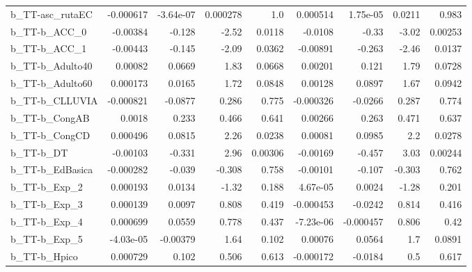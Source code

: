 \begin{tabular}{lrrrrrrrr}
b\_TT-asc\_rutaEC            &   -0.000617 &    -3.64e-07 &  0.000278 &      1.0 &   0.000514 &    1.75e-05 &       0.0211 &         0.983 \\
b\_TT-b\_ACC\_0               &    -0.00384 &       -0.128 &     -2.52 &   0.0118 &    -0.0108 &       -0.33 &        -3.02 &       0.00253 \\
b\_TT-b\_ACC\_1               &    -0.00443 &       -0.145 &     -2.09 &   0.0362 &   -0.00891 &      -0.263 &        -2.46 &        0.0137 \\
b\_TT-b\_Adulto40            &     0.00082 &       0.0669 &      1.83 &   0.0668 &    0.00201 &       0.121 &         1.79 &        0.0728 \\
b\_TT-b\_Adulto60            &    0.000173 &       0.0165 &      1.72 &   0.0848 &    0.00128 &      0.0897 &         1.67 &        0.0942 \\
b\_TT-b\_CLLUVIA             &   -0.000821 &      -0.0877 &     0.286 &    0.775 &  -0.000326 &     -0.0266 &        0.287 &         0.774 \\
b\_TT-b\_CongAB              &      0.0018 &        0.233 &     0.466 &    0.641 &    0.00266 &       0.263 &        0.471 &         0.637 \\
b\_TT-b\_CongCD              &    0.000496 &       0.0815 &      2.26 &   0.0238 &    0.00081 &      0.0985 &          2.2 &        0.0278 \\
b\_TT-b\_DT                  &    -0.00103 &       -0.331 &      2.96 &  0.00306 &   -0.00169 &      -0.457 &         3.03 &       0.00244 \\
b\_TT-b\_EdBasica            &   -0.000282 &       -0.039 &    -0.308 &    0.758 &   -0.00101 &      -0.107 &       -0.303 &         0.762 \\
b\_TT-b\_Exp\_2               &    0.000193 &       0.0134 &     -1.32 &    0.188 &   4.67e-05 &      0.0024 &        -1.28 &         0.201 \\
b\_TT-b\_Exp\_3               &    0.000139 &       0.0097 &     0.808 &    0.419 &  -0.000453 &     -0.0242 &        0.814 &         0.416 \\
b\_TT-b\_Exp\_4               &    0.000699 &       0.0559 &     0.778 &    0.437 &  -7.23e-06 &   -0.000457 &        0.806 &          0.42 \\
b\_TT-b\_Exp\_5               &   -4.03e-05 &     -0.00379 &      1.64 &    0.102 &    0.00076 &      0.0564 &          1.7 &        0.0891 \\
b\_TT-b\_Hpico               &    0.000729 &        0.102 &     0.506 &    0.613 &  -0.000172 &     -0.0184 &          0.5 &         0.617 \\

\end{tabular}
